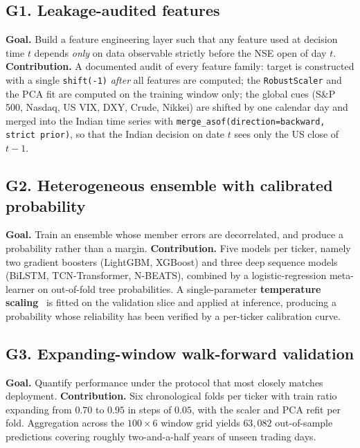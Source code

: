 \subsection*{G1. Leakage-audited features}
\textbf{Goal.} Build a feature engineering layer such that any feature used at decision time $t$ depends \emph{only} on data observable strictly before the NSE open of day $t$. \textbf{Contribution.} A documented audit of every feature family: target is constructed with a single \texttt{shift(-1)} \emph{after} all features are computed; the \texttt{RobustScaler} and the PCA fit are computed on the training window only; the global cues (S\&P 500, Nasdaq, US VIX, DXY, Crude, Nikkei) are shifted by one calendar day and merged into the Indian time series with \texttt{merge\_asof(direction=\textquotesingle backward\textquotesingle, strict prior)}, so that the Indian decision on date $t$ sees only the US close of $t-1$.

\subsection*{G2. Heterogeneous ensemble with calibrated probability}
\textbf{Goal.} Train an ensemble whose member errors are decorrelated, and produce a probability rather than a margin. \textbf{Contribution.} Five models per ticker, namely two gradient boosters (LightGBM, XGBoost) and three deep sequence models (BiLSTM, TCN-Transformer, N-BEATS), combined by a logistic-regression meta-learner on out-of-fold tree probabilities. A single-parameter \textbf{temperature scaling}~\cite{guo2017calibration} is fitted on the validation slice and applied at inference, producing a probability whose reliability has been verified by a per-ticker calibration curve.

\subsection*{G3. Expanding-window walk-forward validation}
\textbf{Goal.} Quantify performance under the protocol that most closely matches deployment. \textbf{Contribution.} Six chronological folds per ticker with train ratio expanding from $0.70$ to $0.95$ in steps of $0.05$, with the scaler and PCA refit per fold. Aggregation across the $100 \times 6$ window grid yields $63{,}082$ out-of-sample predictions covering roughly two-and-a-half years of unseen trading days.


